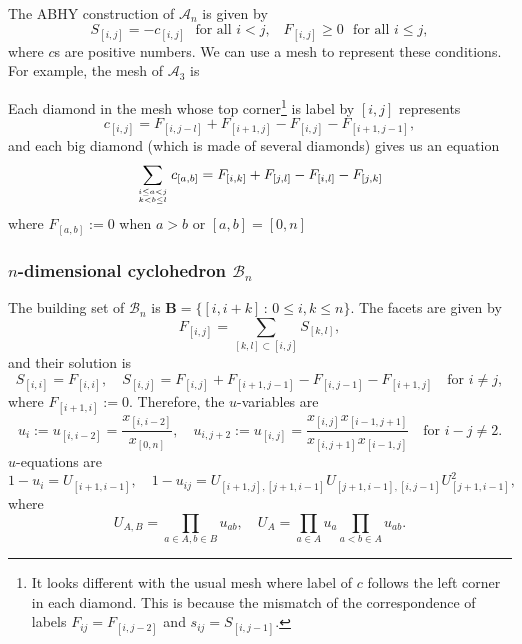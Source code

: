 \documentclass[hidelinks,12pt]{article}
\begin{document}
The ABHY construction of $\mathscr A_n$ is given by 
\[
	S_{[i,j]}=-c_{[i,j]} \,\,\text{ for all $i<j$,}\quad
	F_{[i,j]}\geq 0 \,\,\text{ for all $i\leq j$},
\]
where $c$s are positive numbers. We can use a mesh to represent these conditions.
For example, the mesh of $\mathscr A_3$ is 
\begin{center}
\end{center}
Each diamond in the mesh whose top corner\footnote{
It looks different with the usual mesh where label of $c$ follows the left corner
in each diamond. This is because the mismatch of the correspondence of labels 
$F_{ij}=F_{[i,j-2]}$ and $s_{ij}=S_{[i,j-1]}$.
}
is label by $[i,j]$ represents 
\[
	c_{[i,j]}=F_{[i,j-l]}+F_{[i+1,j]}-F_{[i,j]}-F_{[i+1,j-1]},
\]
and each big diamond (which is made of several diamonds) gives us an equation
\[
	\sum_{i\leq a<j\atop{k<b\leq l}} c_{[a,b]} = 
	F_{[i,k]}+F_{[j,l]}-F_{[i,l]}-F_{[j,k]}
\]
where $F_{[a,b]}:=0$ when $a>b$ or $[a,b]=[0,n]$

\subsubsection*{$n$-dimensional cyclohedron $\mathscr B_n$}

The building set of $\mathscr B_n$ is $\mathbf B=\{[i,i+k]\,:\,0\leq i, k\leq n\}$.
The facets are given by 
\[
F_{[i,j]}=\sum_{[k,l]\subset [i,j]}S_{[k,l]},
\]
and their solution is 
\[
S_{[i,i]}=F_{[i,i]},\quad S_{[i,j]}=F_{[i,j]}+F_{[i+1,j-1]}-F_{[i,j-1]}-F_{[i+1,j]}\quad \text{for $i\neq j$},
\]
where $F_{[i+1,i]}:=0$. Therefore, the $u$-variables are
\[
u_i:=u_{[i,i-2]}=\frac{x_{[i,i-2]}}{x_{[0,n]}},\quad 
u_{i,j+2}:=u_{[i,j]}=\frac{x_{[i,j]}x_{[i-1,j+1]}}{x_{[i,j+1]}x_{[i-1,j]}}
\quad \text{for $i-j\neq 2$}.
\]
$u$-equations are
\[
1-u_i=U_{[i+1,i-1]},\quad 
1-u_{ij}=U_{[i+1,j],[j+1,i-1]}U_{[j+1,i-1],[i,j-1]}U^2_{[j+1,i-1]},
\]
where 
\[
U_{A,B}=\prod_{a\in A,b\in B}u_{ab},\quad 
U_A=\prod_{a\in A}u_a\prod_{a<b\in A}u_{ab}.
\]
\end{document}
